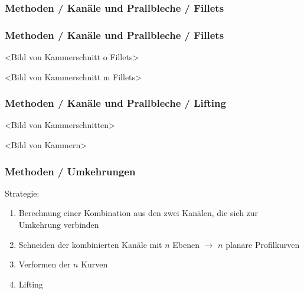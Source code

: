 \documentclass[8pt, aspectratio=169]{beamer}
\begin{document}
\begin{frame}
	\frametitle{Methoden / Kanäle und Prallbleche / Fillets}
	\vspace{-1cm}\hspace{-0.5cm}
	\begin{figure}[H]
		\centering
		
		\label{fig:filletconstruction}
	\end{figure}
	\begin{figure}[H]
		\centering
		
	\end{figure}
\end{frame}

\begin{frame}
	\frametitle{Methoden / Kanäle und Prallbleche / Fillets}
	\vspace{-1cm}\hspace{-0.5cm}
	\begin{minipage}[t]{.49\textwidth}
		\centering
		<Bild von Kammerschnitt o Fillets>
	\end{minipage}
	\begin{minipage}[t]{.49\textwidth}
		\centering
		<Bild von Kammerschnitt m Fillets>
	\end{minipage}
\end{frame}

\begin{frame}
	\frametitle{Methoden / Kanäle und Prallbleche / Lifting}
	\vspace{-1cm}\hspace{-0.5cm}
	\begin{minipage}[t]{.49\textwidth}
		\centering
		<Bild von Kammerschnitten>
	\end{minipage}
	\begin{minipage}[t]{.49\textwidth}
		\centering
		<Bild von Kammern>
	\end{minipage}
\end{frame}

\begin{frame}
	\frametitle{Methoden / Umkehrungen}
	\vspace{-1cm}\hspace{-0.5cm}
	\begin{minipage}[t]{\textwidth}
		Strategie:
		\begin{enumerate}
			\item Berechnung einer Kombination aus den zwei Kanälen, die sich zur Umkehrung verbinden
			\item Schneiden der kombinierten Kanäle mit $n$ Ebenen $\rightarrow$ $n$ planare Profilkurven
			\item Verformen der $n$ Kurven
			\item Lifting
		\end{enumerate}
	\end{minipage}
\end{frame}
\end{document}
